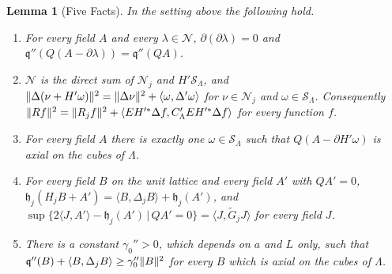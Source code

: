 \documentclass[11pt]{preprint}
\DeclarePairedDelimiter{\norm}{\lVert}{\rVert}
\numberwithin{equation}{section}
\newtheorem{lemma}[theorem]{Lemma}
\theoremstyle{definition}
\theoremstyle{remark}
\theoremstyle{plain}
\begin{document}
\begin{lemma}[Five Facts]\label{lem:five-facts}
In the setting above the following hold.
\begin{enumerate}[label=(\roman*)]
\item For every field $A$ and every $\lambda \in \mathcal N$, $\partial(\partial\lambda) = 0$ and $\mathfrak q''(Q(A - \partial\lambda)) = \mathfrak q''(QA)$.
\item $\mathcal N$ is the direct sum of $\mathcal N_j$ and $H'\mathcal S_\Lambda$, and $\norm{\Delta(\nu + H'\omega)}^2 = \norm{\Delta\nu}^2 + \langle\omega, \Delta'\omega\rangle$ for $\nu \in \mathcal N_j$ and $\omega \in \mathcal S_\Lambda$. Consequently $\norm{Rf}^2 = \norm{R_jf}^2 + \langle EH'^*\Delta f, C'_\Lambda EH'^*\Delta f\rangle$ for every function $f$.
\item For every field $A$ there is exactly one $\omega \in \mathcal S_\Lambda$ such that $Q(A - \partial H'\omega)$ is axial on the cubes of $\Lambda$.
\item For every field $B$ on the unit lattice and every field $A'$ with $QA' = 0$, $\mathfrak h_j(H_jB + A') = \langle B, \Delta_jB\rangle + \mathfrak h_j(A')$, and $\sup\{ 2\langle J, A'\rangle - \mathfrak h_j(A') \, | \, QA' = 0 \} = \langle J, \tilde G_jJ\rangle$ for every field $J$.
\item There is a constant $\gamma_0'' > 0$, which depends on $a$ and $L$ only, such that $\mathfrak q''(B) + \langle B, \Delta_jB\rangle \geq \gamma_0''\norm B^2$ for every $B$ which is axial on the cubes of $\Lambda$.
\end{enumerate}
\end{lemma}
\end{document}
